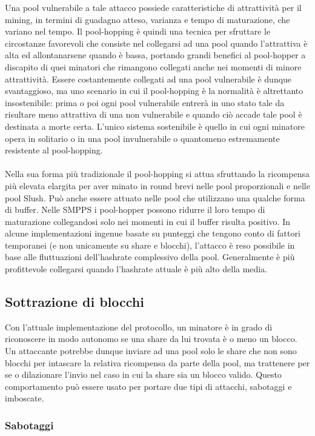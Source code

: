 Una pool vulnerabile a tale attacco possiede caratteristiche di attrattività per il mining, in termini di guadagno atteso, varianza e tempo di maturazione, che variano nel tempo. Il pool-hopping è quindi una tecnica per sfruttare le circostanze favorevoli che consiste nel collegarsi ad una pool quando l'attrattiva è alta ed allontanarsene quando è bassa, portando grandi benefici al pool-hopper a discapito di quei minatori che rimangono collegati anche nei momenti di minore attrattività.
Essere costantemente collegati ad una pool vulnerabile è dunque svantaggioso, ma uno scenario in cui il pool-hopping è la normalità è altrettanto insostenibile: prima o poi ogni pool vulnerabile entrerà in uno stato tale da risultare meno attrattiva di una non vulnerabile e quando ciò accade tale pool è destinata a morte certa. L'unico sistema sostenibile è quello in cui ogni minatore opera in solitario o in una pool invulnerabile o quantomeno estremamente resistente al pool-hopping.\\\\
Nella sua forma più tradizionale il pool-hopping si attua sfruttando la ricompensa più elevata elargita per aver minato in round brevi nelle pool proporzionali e nelle pool Slush.
Può anche essere attuato nelle pool che utilizzano una qualche forma di buffer. Nelle SMPPS i pool-hopper possono ridurre il loro tempo di maturazione collegandosi solo nei momenti in cui il buffer risulta positivo.
In alcune implementazioni ingenue basate su punteggi che tengono conto di fattori temporanei (e non unicamente su share e blocchi), l'attacco è reso possibile in base alle fluttuazioni dell'hashrate complessivo della pool. Generalmente è più profittevole collegarsi quando l'hashrate attuale è più alto della media.

\subsection{Sottrazione di blocchi}

Con l'attuale implementazione del protocollo, un minatore è in grado di riconoscere in modo autonomo se una share da lui trovata è o meno un blocco. Un attaccante potrebbe dunque inviare ad una pool solo le share che non sono blocchi per intascare la relativa ricompensa da parte della pool, ma trattenere per se o dilazionare l'invio nel caso in cui la share sia un blocco valido. Questo comportamento può essere usato per portare due tipi di attacchi, sabotaggi e imboscate.

\subsubsection{Sabotaggi}

